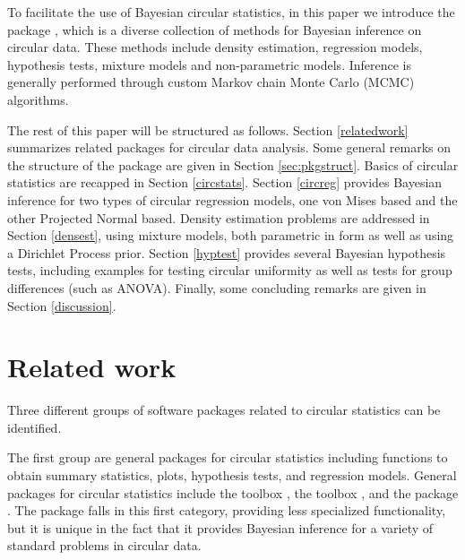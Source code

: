 To facilitate the use of Bayesian circular statistics, in this paper we
introduce the  package , which is a diverse
collection of methods for Bayesian inference on circular data. These
methods include density estimation, regression models, hypothesis tests,
mixture models and non-parametric models. Inference is generally
performed through custom Markov chain Monte Carlo (MCMC) algorithms.

The rest of this paper will be structured as follows. Section
\ref{relatedwork} summarizes related packages for circular data
analysis. Some general remarks on the structure of the package are given
in Section \ref{sec:pkgstruct}. Basics of circular statistics are
recapped in Section \ref{circstats}. Section \ref{circreg} provides
Bayesian inference for two types of circular regression models, one von
Mises based and the other Projected Normal based. Density estimation
problems are addressed in Section \ref{densest}, using mixture models,
both parametric in form as well as using a Dirichlet Process prior.
Section \ref{hyptest} provides several Bayesian hypothesis tests,
including examples for testing circular uniformity as well as tests for
group differences (such as ANOVA). Finally, some concluding remarks are
given in Section \ref{discussion}.

\hypertarget{related-work}{%
\section{Related work}\label{related-work}}

\label{relatedwork}

Three different groups of software packages related to circular
statistics can be identified.

The first group are general packages for circular statistics including
functions to obtain summary statistics, plots, hypothesis tests, and
regression models. General packages for circular statistics include the
 toolbox  \citep{cox1998circstat}, the
 toolbox  \citep{berens2009circstat},
and the  package  \citep{lund2013package}. The
package  falls in this first category, providing less
specialized functionality, but it is unique in the fact that it provides
Bayesian inference for a variety of standard problems in circular data.

